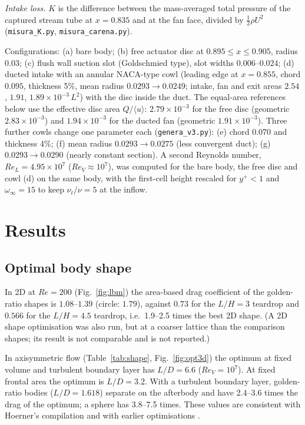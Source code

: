 \documentclass[11pt,a4paper]{article}
\newcommand{\ReV}{\mathit{Re}_V}
\newcommand{\ReL}{\mathit{Re}_L}
\begin{document}
\emph{Intake loss.} $K$ is the difference between the mass-averaged total pressure of the
captured stream tube at $x=0.835$ and at the fan face, divided by $\tfrac12\rho U^2$
(\texttt{misura\_K.py}, \texttt{misura\_carena.py}).

Configurations: (a) bare body; (b) free actuator disc at $0.895\le x\le0.905$, radius
$0.03$; (c) flush wall suction slot (Goldschmied type), slot widths $0.006$--$0.024$;
(d) ducted intake with an annular NACA-type cowl (leading edge at $x=0.855$, chord $0.095$,
thickness 5\%, mean radius $0.0293\to0.0249$; intake, fan and exit areas $2.54$, $1.91$,
$1.89\times10^{-3}\,L^2$) with the disc inside the duct. The equal-area references below use
the effective disc area $Q/\langle u\rangle$: $2.79\times10^{-3}$ for the free disc (geometric
$2.83\times10^{-3}$) and $1.94\times10^{-3}$ for the ducted fan (geometric $1.91\times10^{-3}$). Three further cowls change one
parameter each (\texttt{genera\_v3.py}): (e) chord $0.070$ and thickness 4\%; (f) mean
radius $0.0293\to0.0275$ (less convergent duct); (g) $0.0293\to0.0290$ (nearly constant
section). A second Reynolds number, $\ReL=4.95\times10^7$ ($\ReV\approx10^7$), was computed
for the bare body, the free disc and cowl (d) on the same body, with the first-cell height
rescaled for $y^+<1$ and $\omega_\infty=15$ to keep $\nu_t/\nu=5$ at the inflow.

\section{Results}
\subsection{Optimal body shape}
In 2D at $Re=200$ (Fig.~\ref{fig:lbm}) the area-based drag coefficient of the golden-ratio shapes is
$1.08$--$1.39$ (circle: $1.79$), against $0.73$ for the $L/H=3$ teardrop and $0.566$ for
the $L/H=4.5$ teardrop, i.e.\ 1.9--2.5 times the best 2D shape. (A 2D shape optimisation
was also run, but at a coarser lattice than the comparison shapes; its result is not
comparable and is not reported.)

In axisymmetric flow (Table~\ref{tab:shape}, Fig.~\ref{fig:opt3d}) the optimum at fixed
volume and turbulent boundary layer has $L/D=6.6$ ($\ReV=10^7$). At fixed frontal
area the optimum is $L/D=3.2$. With a turbulent boundary layer, golden-ratio bodies
($L/D=1.618$) separate on the afterbody and have 2.4--3.6 times the drag of the optimum; a
sphere has 3.8--7.5 times. These values are consistent with Hoerner's compilation
\cite{hoerner1965} and with earlier optimisations \cite{parsons1974,lutz1998}.
\end{document}

